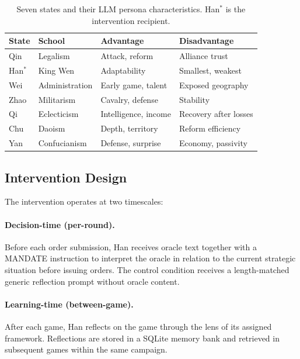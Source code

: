 \documentclass[11pt]{article}
\begin{document}
\begin{table}[t]
\centering
\caption{Seven states and their LLM persona characteristics. Han$^*$ is the intervention recipient.}
\label{tab:states}
\begin{tabular}{llll}
\toprule
State & School & Advantage & Disadvantage \\
\midrule
Qin & Legalism & Attack, reform & Alliance trust \\
Han$^*$ & King Wen & Adaptability & Smallest, weakest \\
Wei & Administration & Early game, talent & Exposed geography \\
Zhao & Militarism & Cavalry, defense & Stability \\
Qi & Eclecticism & Intelligence, income & Recovery after losses \\
Chu & Daoism & Depth, territory & Reform efficiency \\
Yan & Confucianism & Defense, surprise & Economy, passivity \\
\bottomrule
\end{tabular}
\end{table}

\subsection{Intervention Design}
\label{sec:intervention}

The intervention operates at two timescales:

\paragraph{Decision-time (per-round).} Before each order submission, Han receives oracle text together with a \textsc{MANDATE} instruction to interpret the oracle in relation to the current strategic situation before issuing orders. The control condition receives a length-matched generic reflection prompt without oracle content.

\paragraph{Learning-time (between-game).} After each game, Han reflects on the game through the lens of its assigned framework. Reflections are stored in a SQLite memory bank and retrieved in subsequent games within the same campaign.
\end{document}
